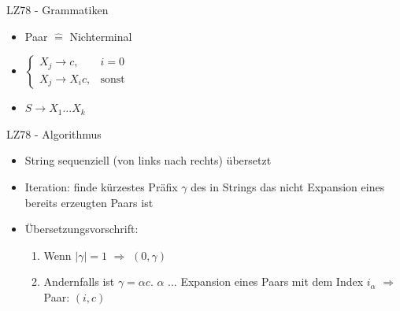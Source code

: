 \begin{frame}{\FrameName}
	\begin{block}{LZ78 - Grammatiken}
		\begin{itemize}[<+->]
			\item Paar $\hat{=}$ Nichterminal
			\item $\begin{cases}
				X_j \rightarrow c, & i = 0\\
				X_j \rightarrow X_i c, & \text{sonst}
			\end{cases}$
			\item $S \rightarrow X_1 ... X_k$
			
		\end{itemize}
	
	\end{block}
	\end{frame}

\begin{frame}{\FrameName}
\begin{block}{LZ78 - Algorithmus}
	\begin{itemize}[<+->]
		\item String sequenziell (von links nach rechts) übersetzt
		\item Iteration: finde kürzestes Präfix $\gamma$ des in Strings das nicht Expansion eines bereits erzeugten Paars ist
		\item Übersetzungsvorschrift:
		\begin{enumerate}
			\item<4-> Wenn $|\gamma| = 1$ $\Rightarrow$ $(0,\gamma)$
			\item<5-> Andernfalls ist $\gamma = \alpha c$. \linebreak $\alpha$ ... Expansion eines Paars mit dem Index $i_\alpha$ \linebreak $\Rightarrow$ Paar: $(i,c)$
		\end{enumerate}
	\end{itemize}
\end{block}
\end{frame}

